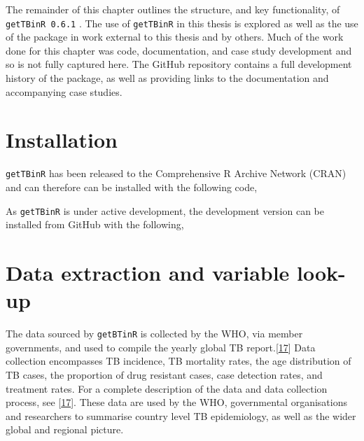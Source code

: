\documentclass[11pt,twoside]{bristolthesis}
\begin{document}
  The remainder of this chapter outlines the structure, and key functionality, of \texttt{getTBinR\ 0.6.1} . The use of \texttt{getTBinR} in this thesis is explored as well as the use of the package in work external to this thesis and by others. Much of the work done for this chapter was code, documentation, and case study development and so is not fully captured here. The GitHub repository contains a full development history of the package, as well as providing links to the documentation and accompanying case studies.
  
  \hypertarget{installation}{%
  \section{Installation}\label{installation}}
  
  \texttt{getTBinR} has been released to the Comprehensive R Archive Network (CRAN) and can therefore can be installed with the following code,
  \begin{Shaded}
  \begin{Highlighting}[]
  \NormalTok{(}\NormalTok{)}
  \end{Highlighting}
  \end{Shaded}
  As \texttt{getTBinR} is under active development, the development version can be installed from GitHub with the following,
  \begin{Shaded}
  \begin{Highlighting}[]
  \OperatorTok{::}\NormalTok{(}\NormalTok{)}
  \end{Highlighting}
  \end{Shaded}
  \hypertarget{data-extraction-and-variable-look-up}{%
  \section{Data extraction and variable look-up}\label{data-extraction-and-variable-look-up}}
  
  The data sourced by \texttt{getBTinR} is collected by the WHO, via member governments, and used to compile the yearly global TB report.{[}\protect\hyperlink{ref-WHO:2018}{17}{]} Data collection encompasses TB incidence, TB mortality rates, the age distribution of TB cases, the proportion of drug resistant cases, case detection rates, and treatment rates. For a complete description of the data and data collection process, see {[}\protect\hyperlink{ref-WHO:2018}{17}{]}. These data are used by the WHO, governmental organisations and researchers to summarise country level TB epidemiology, as well as the wider global and regional picture.
  
\end{document}
